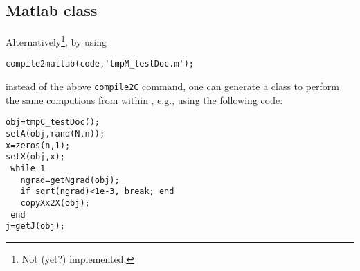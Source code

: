 \documentclass[11pt]{article}
\begin{document}
\subsection{Matlab class}

Alternatively\footnote{Not (yet?) implemented.}, by using
\begin{lstlisting}
compile2matlab(code,'tmpM_testDoc.m');
\end{lstlisting}
instead of the above \lstinline{compile2C} command, one can generate a
\matlab{} class to perform the same computions from within \matlab{},
e.g., using the following code:
\begin{lstlisting}
obj=tmpC_testDoc();
setA(obj,rand(N,n));
x=zeros(n,1);
setX(obj,x);
 while 1
   ngrad=getNgrad(obj);
   if sqrt(ngrad)<1e-3, break; end
   copyXx2X(obj);
 end
j=getJ(obj);
\end{lstlisting}




% 
% 
% 

\end{document}

